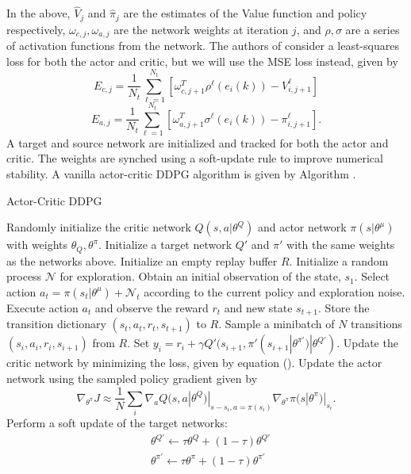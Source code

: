 \documentclass[10pt,conference]{IEEEtran}
\begin{document}
	In the above, $\widehat{V}_j$ and $\widehat{\pi}_j$ are the estimates of the Value function and policy respectively, $\omega_{c,j}, \omega_{a,j}$ are the network weights at iteration $j$, and $\rho, \sigma$ are a series of activation functions from the network. The authors of \cite{FLAIRS1612802} consider a least-squares loss for both the actor and critic, but we will use the MSE loss instead, given by
	\begin{equation}
		\label{critic_loss}
		\displaystyle E_{c,j} = \frac{1}{N_t}\sum\limits_{\ell=1}^{N_t}{\left[ \omega_{c,j+1}^T\rho^\ell(e_i(k)) - V_{i,j+1}^\ell \right]}
	\end{equation}
	\begin{equation}
		\label{actor_loss}
		\displaystyle E_{a,j} = \frac{1}{N_t}\sum\limits_{\ell=1}^{N_t}{\left[ \omega_{a,j+1}^T\sigma^\ell(e_i(k)) - \pi_{i,j+1}^\ell \right]}.
	\end{equation}
	A target and source network are initialized and tracked for both the actor and critic. The weights are synched using a soft-update rule to improve numerical stability. A vanilla actor-critic DDPG algorithm is given by Algorithm .
	\begin{algorithm}
		\caption{Actor-Critic DDPG}
		\begin{algorithmic}[1]
			\STATE Randomly initialize the critic network $Q(s, a|\theta^Q)$ and actor network $\pi(s|\theta^\mu)$ with weights $\theta_Q, \theta^\pi$. 
			\STATE Initialize a target network $Q'$ and $\pi'$ with the same weights as the networks above. 
			\STATE Initialize an empty replay buffer $R$.
				\STATE Initialize a random process $\mathcal{N}$ for exploration. 
				\STATE Obtain an initial observation of the state, $s_1$. 
					\STATE Select action $a_t = \pi(s_t|\theta^\mu) + \mathcal{N}_t$ according to the current policy and exploration noise.
					\STATE Execute action $a_t$ and observe the reward $r_t$ and new state $s_{t+1}$. 
					\STATE Store the transition dictionary $(s_t, a_t, r_t, s_{t+1})$ to $R$.
					\STATE Sample a minibatch of $N$ transitions $(s_i, a_i, r_i, s_{i+1})$ from $R$.
					\STATE Set $y_i = r_i + \gamma Q'(s_{i+1}, \pi'(s_{i+1}|\theta^{\pi'})|\theta^{Q'})$. 
					\STATE Update the critic network by minimizing the loss, given by equation ().
					\STATE Update the actor network using the sampled policy gradient given by 
					\begin{equation*}
						\displaystyle \nabla_{\theta^\pi} J \approx \frac{1}{N}\sum\limits_{i}{\nabla_a Q(s,a|\theta^Q)|_{s - s_i, a = \pi(s_i)}\nabla_{\theta^\pi}\pi(s|\theta^\pi)|_{s_i}}.
					\end{equation*}
					\STATE Perform a soft update of the target networks:
					\begin{align*}
						&\theta^{Q'} \leftarrow \tau\theta^Q + (1-\tau)\theta^{Q'} \\
						&\theta^{\pi'} \leftarrow \tau \theta^\pi + (1-\tau)\theta^{\pi'}
					\end{align*}
				\ENDFOR
			\ENDFOR
		\end{algorithmic}
		\label{acddpg}
	\end{algorithm}
\end{document}
